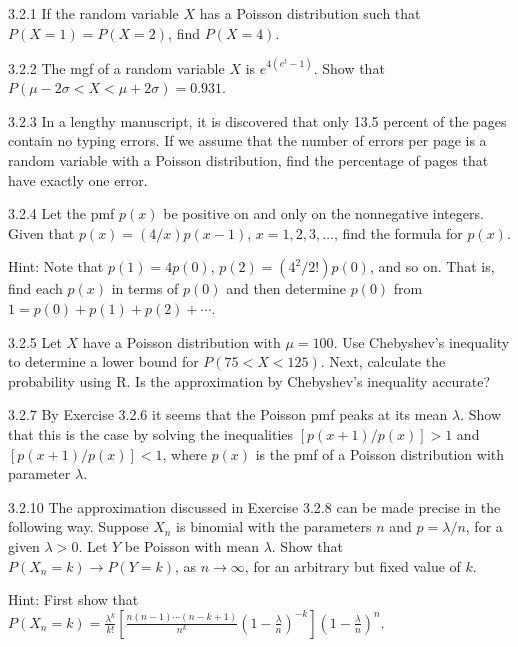 \begin{exercise}{3.2.1}
If the random variable $X$ has a Poisson distribution such that $P(X = 1) = P(X = 2)$, find $P(X = 4)$.
\end{exercise}

\begin{exercise}{3.2.2}
The mgf of a random variable $X$ is $e^{4(e^t - 1)}$. Show that $P(\mu - 2\sigma < X < \mu + 2\sigma) = 0.931$.
\end{exercise}

\begin{exercise}{3.2.3}
In a lengthy manuscript, it is discovered that only 13.5 percent of the pages contain no typing errors. If we assume that the number of errors per page is a random variable with a Poisson distribution, find the percentage of pages that have exactly one error.
\end{exercise}

\begin{exercise}{3.2.4}
Let the pmf $p(x)$ be positive on and only on the nonnegative integers. Given that $p(x) = (4/x)p(x-1)$, $x = 1, 2, 3, \ldots$, find the formula for $p(x)$.

Hint: Note that $p(1) = 4p(0)$, $p(2) = (4^2/2!)p(0)$, and so on. That is, find each $p(x)$ in terms of $p(0)$ and then determine $p(0)$ from $1 = p(0) + p(1) + p(2) + \cdots$.
\end{exercise}

\begin{exercise}{3.2.5}
Let $X$ have a Poisson distribution with $\mu = 100$. Use Chebyshev's inequality to determine a lower bound for $P(75 < X < 125)$. Next, calculate the probability using R. Is the approximation by Chebyshev's inequality accurate?
\end{exercise}

\begin{exercise}{3.2.7}
By Exercise 3.2.6 it seems that the Poisson pmf peaks at its mean $\lambda$. Show that this is the case by solving the inequalities $[p(x+1)/p(x)] > 1$ and $[p(x+1)/p(x)] < 1$, where $p(x)$ is the pmf of a Poisson distribution with parameter $\lambda$.
\end{exercise}

\begin{exercise}{3.2.10}
The approximation discussed in Exercise 3.2.8 can be made precise in the following way. Suppose $X_n$ is binomial with the parameters $n$ and $p = \lambda/n$, for a given $\lambda > 0$. Let $Y$ be Poisson with mean $\lambda$. Show that $P(X_n = k) \to P(Y = k)$, as $n \to \infty$, for an arbitrary but fixed value of $k$.

Hint: First show that $P(X_n = k) = \frac{\lambda^k}{k!}\left[\frac{n(n-1)\cdots(n-k+1)}{n^k}\left(1-\frac{\lambda}{n}\right)^{-k}\right]\left(1-\frac{\lambda}{n}\right)^n$.
\end{exercise}


